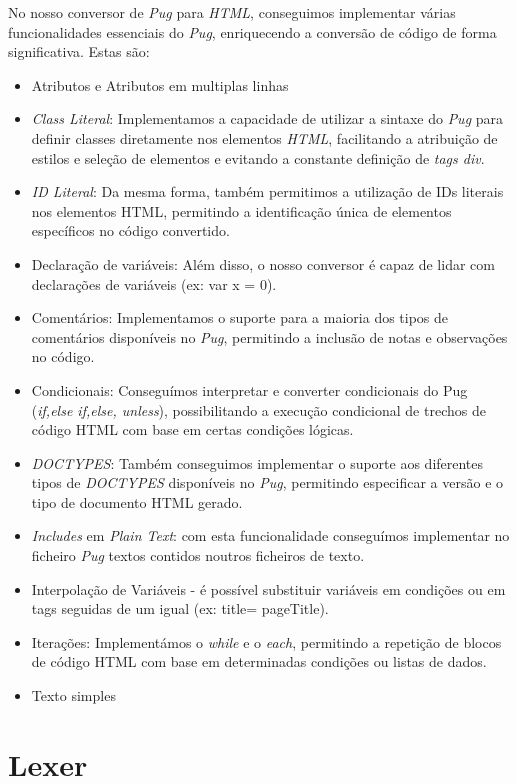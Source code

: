 \documentclass[11pt,a4paper]{report}%
\begin{document}
No nosso conversor de \textit{Pug} para \textit{HTML}, conseguimos implementar várias funcionalidades essenciais do \textit{Pug}, enriquecendo a conversão de código de forma significativa. Estas são:
\begin{itemize}
    \item Atributos e Atributos em multiplas linhas
    \item \textit{Class Literal}: Implementamos a capacidade de utilizar a sintaxe do \textit{Pug} para definir classes diretamente nos elementos \textit{HTML}, facilitando a atribuição de estilos e seleção de elementos e evitando a constante definição de \textit{tags div}.
    \item \textit{ID Literal}: Da mesma forma, também permitimos a utilização de IDs literais nos elementos HTML, permitindo a identificação única de elementos específicos no código convertido.
    \item Declaração de variáveis: Além disso, o nosso conversor é capaz de lidar com declarações de variáveis (ex: var x = 0).
    \item Comentários: Implementamos o suporte para a maioria dos tipos de comentários disponíveis no \textit{Pug}, permitindo a inclusão de notas e observações no código.
    \item Condicionais: Conseguímos interpretar e converter condicionais do Pug (\textit{if,else if,else, unless}), possibilitando a execução condicional de trechos de código HTML com base em certas condições lógicas.
    \item \textit{DOCTYPES}: Também conseguimos implementar o suporte aos diferentes tipos de \textit{DOCTYPES} disponíveis no \textit{Pug}, permitindo especificar a versão e o tipo de documento HTML gerado.
    \item \textit{Includes} em \textit{Plain Text}: com esta funcionalidade conseguímos implementar no ficheiro \textit{Pug} textos contidos noutros ficheiros de texto.
    \item Interpolação de Variáveis - é possível substituir variáveis em condições ou em tags seguidas de um igual (ex: title= pageTitle).
    \item Iterações: Implementámos o \textit{while} e o \textit{each}, permitindo a repetição de blocos de código HTML com base em determinadas condições ou listas de dados.
    \item Texto simples
\end{itemize}

\section{Lexer}
\end{document}
